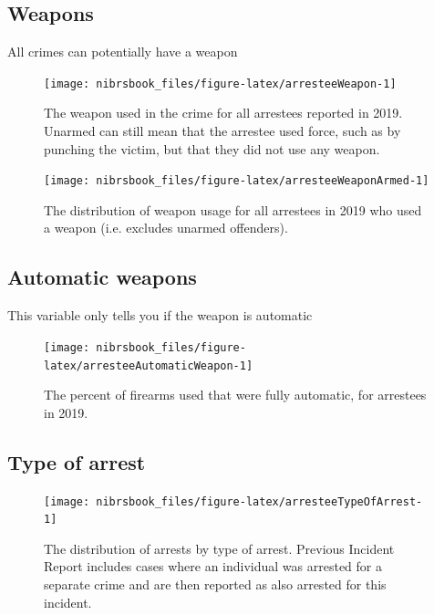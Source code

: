 \documentclass[
  12pt,
  openany]{book}
\begin{document}
\hypertarget{weapons-1}{%
\subsection{Weapons}\label{weapons-1}}

All crimes can potentially have a weapon

\begin{figure}

{\centering \texttt{[image: nibrsbook\_files/figure-latex/arresteeWeapon-1]} 

}

\caption{The weapon used in the crime for all arrestees reported in 2019. Unarmed can still mean that the arrestee used force, such as by punching the victim, but that they did not use any weapon.}\label{fig:arresteeWeapon}
\end{figure}

\begin{figure}

{\centering \texttt{[image: nibrsbook\_files/figure-latex/arresteeWeaponArmed-1]} 

}

\caption{The distribution of weapon usage for all arrestees in 2019 who used a weapon (i.e. excludes unarmed offenders).}\label{fig:arresteeWeaponArmed}
\end{figure}

\hypertarget{automatic-weapons-1}{%
\subsection{Automatic weapons}\label{automatic-weapons-1}}

This variable only tells you if the weapon is automatic

\begin{figure}

{\centering \texttt{[image: nibrsbook\_files/figure-latex/arresteeAutomaticWeapon-1]} 

}

\caption{The percent of firearms used that were fully automatic, for arrestees in 2019.}\label{fig:arresteeAutomaticWeapon}
\end{figure}

\hypertarget{type-of-arrest}{%
\subsection{Type of arrest}\label{type-of-arrest}}

\begin{figure}

{\centering \texttt{[image: nibrsbook\_files/figure-latex/arresteeTypeOfArrest-1]} 

}

\caption{The distribution of arrests by type of arrest. Previous Incident Report includes cases where an individual was arrested for a separate crime and are then reported as also arrested for this incident.}\label{fig:arresteeTypeOfArrest}
\end{figure}
\end{document}
